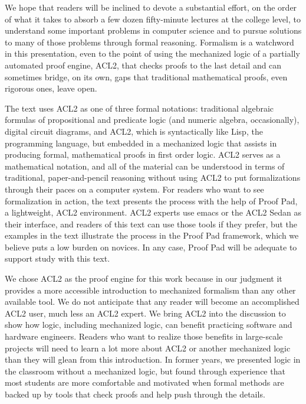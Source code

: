 We hope that readers will be inclined
to devote a substantial effort, on the order
of what it takes to absorb a few dozen fifty-minute
lectures at the college level,
to understand some important problems in computer science and
to pursue solutions to many of those problems through formal reasoning.
Formalism is a watchword in this presentation, even to the
point of using the mechanized logic of a partially automated proof engine,
ACL2, that checks proofs to the last detail and can sometimes
bridge, on its own, gaps that traditional mathematical
proofs, even rigorous ones, leave open.

The text uses ACL2 as one of three formal notations:
traditional algebraic formulas of propositional and predicate logic
(and numeric algebra, occasionally), 
digital circuit diagrams, and ACL2, which is syntactically
like Lisp, the programming language, but embedded
in a mechanized logic that assists in producing
formal, mathematical proofs in first order logic.
ACL2 serves as a mathematical notation, and all
of the material can be understood in terms of 
traditional, paper-and-pencil reasoning 
without using ACL2 to put formalizations 
through their paces on a computer system.
For readers who want to see formalization
in action, the text presents the process with
the help of Proof Pad, a lightweight, ACL2 environment. 
ACL2 experts use emacs or the ACL2 Sedan
as their interface, and readers of this text can
use those tools if they prefer, but the examples in the text
illustrate the process in the Proof Pad framework,
which we believe puts a low burden on novices.
In any case, Proof Pad will be adequate to support 
study with this text.

We chose ACL2 as the proof engine for this work
because in our judgment it provides a more accessible
introduction to mechanized formalism than any other
available tool. We do not anticipate that any
reader will become an accomplished ACL2 user,
much less an ACL2 expert. We bring ACL2 into the discussion
to show how logic, including mechanized logic,
can benefit practicing software and hardware engineers.
Readers who want to realize those benefits in
large-scale projects will need to learn a lot more
about ACL2 or another mechanized logic than they
will glean from this introduction.
In former years, we presented logic in the classroom
without a mechanized logic, but found through experience 
that most students are more comfortable and motivated
when formal methods are backed up by tools
that check proofs and help 
push through the details.

